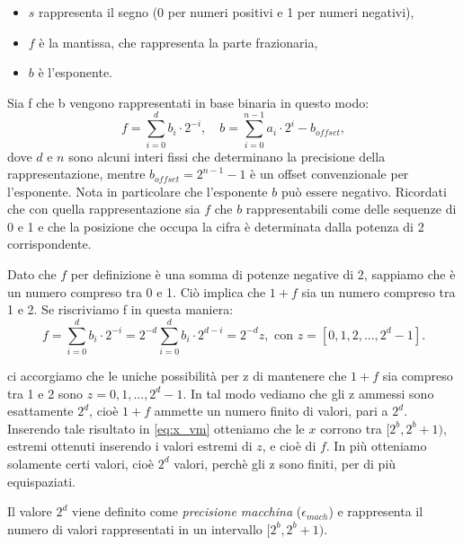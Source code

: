 \documentclass[letterpaper,12pt]{article}
\begin{document}
        \begin{itemize}
            \item $s$ rappresenta il segno (0 per numeri positivi e 1 per numeri negativi),
            \item $f$ è la mantissa, che rappresenta la parte frazionaria,
            \item $b$ è l'esponente.
        \end{itemize}

        Sia f che b vengono rappresentati in base binaria in questo modo:
        \[
            f = \sum_{i=0}^{d} b_i \cdot 2^{-i}, \quad b = \sum_{i=0}^{n-1} a_i \cdot 2^{i} - b_{offset},
        \]
        dove 
        $d$ e $n$ sono alcuni interi fissi che determinano la precisione della rappresentazione, mentre 
        $b_{offset} = 2^{n-1} -1 $ è un offset convenzionale per l'esponente. Nota in particolare che l'esponente 
        $b$ può essere negativo. Ricordati che  con quella rappresentazione sia $f$ che $b$ rappresentabili come delle
        sequenze di 0 e 1 e che la posizione che occupa la cifra è determinata dalla potenza di 2 corrispondente.

        Dato che $f$ per definizione è una somma di potenze negative di 2, sappiamo che è un numero compreso tra 0 e 1.
        Ciò implica che $1+f$ sia un numero compreso tra 1 e 2. Se riscriviamo f in questa maniera:
        \[
            f = \sum_{i=0}^{d} b_i \cdot 2^{-i} = 2^{-d} \sum_{i=0}^{d} b_i \cdot 2^{d-i} = 2^{-d}z,
            \text{ con } z = [0, 1, 2, ..., 2^{d}-1].
        \]

        ci accorgiamo che le uniche possibilità per z di mantenere che $1+f$ sia compreso tra 1 e 2 sono 
        $z = 0, 1, ..., 2^{d} - 1$.
        In tal modo vediamo che gli z ammessi sono esattamente $2^{d}$, cioè $1+f$ ammette un numero finito di valori, pari
        a $2^{d}$. Inserendo tale risultato in \eqref{eq:x_vm} otteniamo che le $x$ corrono tra $[2^b, 2^b+1)$, 
        estremi ottenuti inserendo i valori estremi di $z$, e cioè di $f$. In più otteniamo solamente certi valori,
        cioè $2^{d}$ valori, perchè gli z sono finiti, per di più equispaziati.
        
        Il valore $2^d$ viene definito come \textit{precisione macchina} ($\epsilon_{mach}$) e rappresenta il numero 
        di valori rappresentati in un intervallo $[2^b, 2^b+1)$. 
        
        
    
\end{document}
